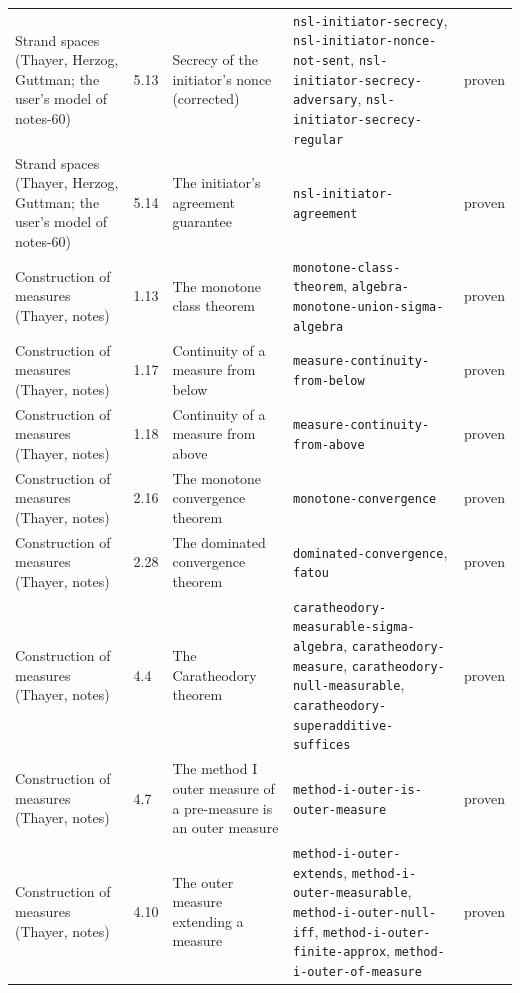 \begin{longtable}{@{}ll>{\raggedright\arraybackslash}p{4.2cm}>{\raggedright\arraybackslash}p{4.2cm}l@{}}
Strand spaces (Thayer, Herzog, Guttman; the user's model of notes-60) & 5.13 & Secrecy of the initiator's nonce (corrected) & \texttt{nsl-\allowbreak{}initiator-\allowbreak{}secrecy}, \texttt{nsl-\allowbreak{}initiator-\allowbreak{}nonce-\allowbreak{}not-\allowbreak{}sent}, \texttt{nsl-\allowbreak{}initiator-\allowbreak{}secrecy-\allowbreak{}adversary}, \texttt{nsl-\allowbreak{}initiator-\allowbreak{}secrecy-\allowbreak{}regular} & proven \\
Strand spaces (Thayer, Herzog, Guttman; the user's model of notes-60) & 5.14 & The initiator's agreement guarantee & \texttt{nsl-\allowbreak{}initiator-\allowbreak{}agreement} & proven \\
Construction of measures (Thayer, notes) & 1.13 & The monotone class theorem & \texttt{monotone-\allowbreak{}class-\allowbreak{}theorem}, \texttt{algebra-\allowbreak{}monotone-\allowbreak{}union-\allowbreak{}sigma-\allowbreak{}algebra} & proven \\
Construction of measures (Thayer, notes) & 1.17 & Continuity of a measure from below & \texttt{measure-\allowbreak{}continuity-\allowbreak{}from-\allowbreak{}below} & proven \\
Construction of measures (Thayer, notes) & 1.18 & Continuity of a measure from above & \texttt{measure-\allowbreak{}continuity-\allowbreak{}from-\allowbreak{}above} & proven \\
Construction of measures (Thayer, notes) & 2.16 & The monotone convergence theorem & \texttt{monotone-\allowbreak{}convergence} & proven \\
Construction of measures (Thayer, notes) & 2.28 & The dominated convergence theorem & \texttt{dominated-\allowbreak{}convergence}, \texttt{fatou} & proven \\
Construction of measures (Thayer, notes) & 4.4 & The Caratheodory theorem & \texttt{caratheodory-\allowbreak{}measurable-\allowbreak{}sigma-\allowbreak{}algebra}, \texttt{caratheodory-\allowbreak{}measure}, \texttt{caratheodory-\allowbreak{}null-\allowbreak{}measurable}, \texttt{caratheodory-\allowbreak{}superadditive-\allowbreak{}suffices} & proven \\
Construction of measures (Thayer, notes) & 4.7 & The method I outer measure of a pre-measure is an outer measure & \texttt{method-\allowbreak{}i-\allowbreak{}outer-\allowbreak{}is-\allowbreak{}outer-\allowbreak{}measure} & proven \\
Construction of measures (Thayer, notes) & 4.10 & The outer measure extending a measure & \texttt{method-\allowbreak{}i-\allowbreak{}outer-\allowbreak{}extends}, \texttt{method-\allowbreak{}i-\allowbreak{}outer-\allowbreak{}measurable}, \texttt{method-\allowbreak{}i-\allowbreak{}outer-\allowbreak{}null-\allowbreak{}iff}, \texttt{method-\allowbreak{}i-\allowbreak{}outer-\allowbreak{}finite-\allowbreak{}approx}, \texttt{method-\allowbreak{}i-\allowbreak{}outer-\allowbreak{}of-\allowbreak{}measure} & proven \\

\end{longtable}
